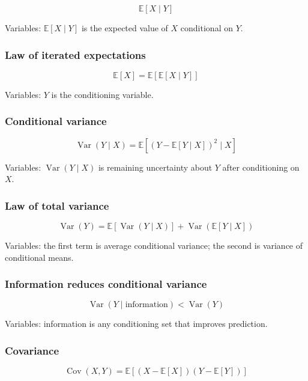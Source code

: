 \documentclass[
  8pt,
  twocolumn]{extarticle}
\begin{document}
\[
\mathbb E[X\mid Y]
\]

Variables: \(\mathbb E[X\mid Y]\) is the expected value of \(X\)
conditional on \(Y\).

\subsubsection{Law of iterated
expectations}\label{law-of-iterated-expectations}

\[
\mathbb E[X]=\mathbb E[\mathbb E[X\mid Y]]
\]

Variables: \(Y\) is the conditioning variable.

\subsubsection{Conditional variance}\label{conditional-variance}

\[
\operatorname{Var}(Y\mid X)=\mathbb E[(Y-\mathbb E[Y\mid X])^2\mid X]
\]

Variables: \(\operatorname{Var}(Y\mid X)\) is remaining uncertainty
about \(Y\) after conditioning on \(X\).

\subsubsection{Law of total variance}\label{law-of-total-variance}

\[
\operatorname{Var}(Y)=\mathbb E[\operatorname{Var}(Y\mid X)]+\operatorname{Var}(\mathbb E[Y\mid X])
\]

Variables: the first term is average conditional variance; the second is
variance of conditional means.

\subsubsection{Information reduces conditional
variance}\label{information-reduces-conditional-variance}

\[
\operatorname{Var}(Y\mid \text{information})<\operatorname{Var}(Y)
\]

Variables: information is any conditioning set that improves prediction.

\subsubsection{Covariance}\label{covariance}

\[
\operatorname{Cov}(X,Y)=\mathbb E[(X-\mathbb E[X])(Y-\mathbb E[Y])]
\]
\end{document}
